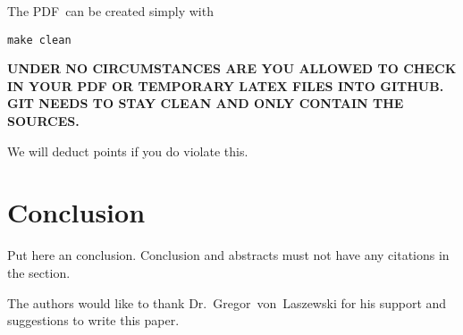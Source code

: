 The PDF\ can be created simply with 

\begin{verbatim}
make clean
\end{verbatim}



{\bf UNDER NO CIRCUMSTANCES ARE YOU ALLOWED TO CHECK IN YOUR PDF OR
  TEMPORARY LATEX FILES INTO GITHUB. GIT NEEDS TO STAY CLEAN AND ONLY
  CONTAIN THE SOURCES.}

We will deduct points if you do violate this.

\section{Conclusion}

Put here an conclusion. Conclusion and abstracts must not have any
citations in the section.


\begin{acks}

  The authors would like to thank Dr.~Gregor~von~Laszewski for his
  support and suggestions to write this paper.

\end{acks}


 

